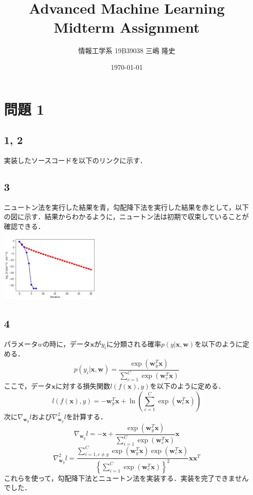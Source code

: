 \documentclass[a4paper,11pt]{jsarticle}
\begin{document}
\title{Advanced Machine Learning Midterm Assignment}
\author{情報工学系 19B39038 三嶋 隆史}
\date{\today}

\maketitle

\section*{問題 1}
\subsection*{1, 2}
実装したソースコードを以下のリンクに示す．

\subsection*{3}
ニュートン法を実行した結果を青，勾配降下法を実行した結果を赤として，以下の図に示す．結果からわかるように，ニュートン法は初期で収束していることが確認できる．
\begin{center}
    \includegraphics[width=5cm]{../src/output_7_1.png} \\
\end{center}

\subsection*{4}
パラメータ$w$の時に，データ$\bm x$が$y_i$に分類される確率$p(y|\bm x, \bm w)$を以下のように定める．
$$
    p(y_i|\bm x, \bm w) = \frac{\exp(\bm{w}_y^T\bm{x})}{\sum_{c=1}^{C} \exp(\bm{w}_c^T\bm{x})}
$$
ここで，データ$\bm x$に対する損失関数$l(f(\bm x), y)$を以下のように定める．
$$
    l(f(\bm x), y) = -\bm{w}_y^T \bm x + \ln \left(\sum_{c=1}^C \exp(\bm{w}_c^T \bm x) \right)
$$
次に$\nabla_{\bm{w}_y} l$および$\nabla_{\bm{w}_y}^2 l$を計算する．
$$
    \nabla_{\bm{w}_y} l = - \bm x +
    \frac{\exp(\bm{w}_y^T \bm x)}{\sum_{i = 1}^{C} \exp(\bm w_c^T \bm x)} \bm x
$$
$$
    \nabla_{\bm{w}_y}^2 l =
    \frac{\sum_{i = 1, c \neq y}^{C} \exp(\bm w_y^T \bm x) \exp(\bm w_c^T \bm x)}{ \left\{ \sum_{i = 1}^{C} \exp(\bm w_c^T \bm x) \right\}^2 }\bm{x}\bm x^T
$$
これらを使って，勾配降下法とニュートン法を実装する．実装を完了できませんでした．
\end{document}
